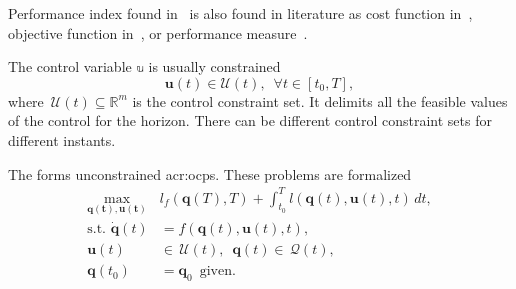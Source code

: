 Performance index found in~\citep{bryson1975applied} is also found in literature as cost function in~\citep{simon2006optimal,stengel1994optimal}, objective function in~\citep{rao2019engineering,sethi2019optimal,rawlings2017model}, or performance measure~\citep{kirk2004optimal}.

The control variable $\mathbb{u}$ is usually constrained
\begin{equation}\label{eq:optimization:control-constraint-set}
    \mathbf{u}(t)\in\mathcal{U}(t),\,\,\,\forall t\in[t_0,T],
\end{equation}
where $\,\mathcal{U}(t)\subseteq \mathbb{R}^m$ is the control constraint set. It delimits all the feasible values of the control for the horizon. There can be different control constraint sets for different instants.

The  forms unconstrained \Gls{acr:ocp}s. These problems are formalized
\begin{equation}\label{eq:optimization:unconstrained-opt-control-pb}\begin{split}
    \max_{\mathbf{\mathbf{q}(t),\mathbf{u}(t)}}&{l_f(\mathbf{q}(T),T)+\int_{t_0}^T{l(\mathbf{q}(t),\mathbf{u}(t),t)\,dt}},\\
    \text{s.t. }\dot{\mathbf{q}}(t)&=f(\mathbf{q}(t),\mathbf{u}(t),t),\\
    \mathbf{u}(t)&\in\,\mathcal{U}(t),\,\,\,\mathbf{q}(t)\in\,\mathcal{Q}(t),\\
    \mathbf{q}(t_0)&=\mathbf{q}_0\,\,\,\text{given}.
\end{split}\end{equation}

